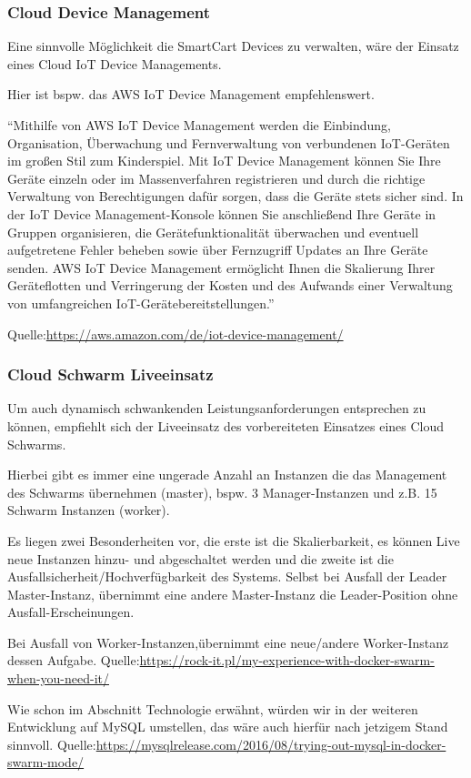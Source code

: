 \documentclass{sigchi}
\begin{document}
\subsubsection{Cloud Device Management}
Eine sinnvolle Möglichkeit die SmartCart Devices zu verwalten, wäre der Einsatz eines Cloud IoT Device Managements.

Hier ist bspw. das AWS IoT Device Management empfehlenswert.

“Mithilfe von AWS IoT Device Management werden die Einbindung, Organisation, Überwachung und Fernverwaltung von verbundenen IoT-Geräten im großen Stil zum Kinderspiel. Mit IoT Device Management können Sie Ihre Geräte einzeln oder im Massenverfahren registrieren und durch die richtige Verwaltung von Berechtigungen dafür sorgen, dass die Geräte stets sicher sind. In der IoT Device Management-Konsole können Sie anschließend Ihre Geräte in Gruppen organisieren, die Gerätefunktionalität überwachen und eventuell aufgetretene Fehler beheben sowie über Fernzugriff Updates an Ihre Geräte senden. AWS IoT Device Management ermöglicht Ihnen die Skalierung Ihrer Geräteflotten und Verringerung der Kosten und des Aufwands einer Verwaltung von umfangreichen IoT-Gerätebereitstellungen.”

Quelle:\url{https://aws.amazon.com/de/iot-device-management/}

\subsubsection{Cloud Schwarm Liveeinsatz}
Um auch dynamisch schwankenden Leistungsanforderungen entsprechen zu können, empfiehlt sich der Liveeinsatz des vorbereiteten Einsatzes eines Cloud Schwarms.

Hierbei gibt es immer eine ungerade Anzahl an Instanzen die das Management des Schwarms übernehmen (master), bspw. 3 Manager-Instanzen und z.B. 15 Schwarm Instanzen (worker).

Es liegen zwei Besonderheiten vor, die erste ist die Skalierbarkeit, es können Live neue Instanzen hinzu- und abgeschaltet werden und die zweite ist die Ausfallsicherheit/Hochverfügbarkeit des Systems. Selbst bei Ausfall der Leader Master-Instanz, übernimmt eine andere Master-Instanz die Leader-Position ohne Ausfall-Erscheinungen.

Bei Ausfall von Worker-Instanzen,übernimmt eine neue/andere Worker-Instanz dessen Aufgabe.
Quelle:\url{https://rock-it.pl/my-experience-with-docker-swarm-when-you-need-it/}

Wie schon im Abschnitt Technologie erwähnt, würden wir in der weiteren Entwicklung auf MySQL umstellen, das wäre auch hierfür nach jetzigem Stand sinnvoll.
Quelle:\url{https://mysqlrelease.com/2016/08/trying-out-mysql-in-docker-swarm-mode/}
\end{document}
